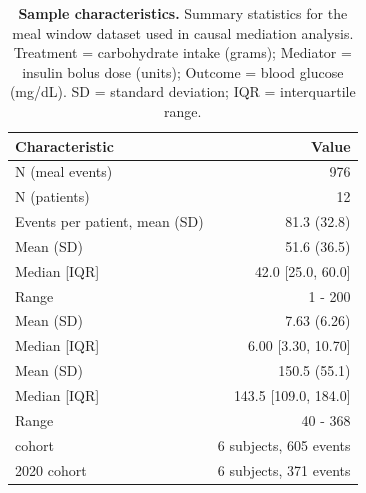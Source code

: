 \begin{table}[ht]
\centering
\caption{\textbf{Sample characteristics.}
Summary statistics for the meal window dataset used in causal mediation analysis.
Treatment = carbohydrate intake (grams); Mediator = insulin bolus dose (units); Outcome = blood glucose (mg/dL).
SD = standard deviation; IQR = interquartile range.}
\label{tab:sample_characteristics}
\begin{tabular}{lr}
\toprule
Characteristic & Value \\
\midrule
N (meal events) & 976 \\
N (patients) & 12 \\
Events per patient, mean (SD) & 81.3 (32.8) \\
\addlinespace
  Mean (SD) & 51.6 (36.5) \\
  Median [IQR] & 42.0 [25.0, 60.0] \\
  Range & 1 - 200 \\
\addlinespace
  Mean (SD) & 7.63 (6.26) \\
  Median [IQR] & 6.00 [3.30, 10.70] \\
\addlinespace
  Mean (SD) & 150.5 (55.1) \\
  Median [IQR] & 143.5 [109.0, 184.0] \\
  Range & 40 - 368 \\
\addlinespace
  2018 cohort & 6 subjects, 605 events \\
  2020 cohort & 6 subjects, 371 events \\
\bottomrule
\end{tabular}
\end{table}
